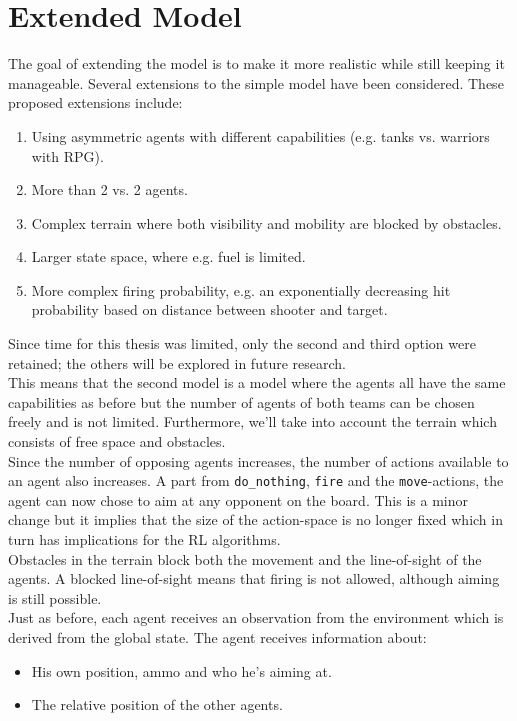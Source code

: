 \section{Extended Model}
\label{sec:extended_model}
The goal of extending the model is to make it more realistic while still keeping it manageable. Several extensions to the simple model have been considered. These proposed extensions include:
\begin{enumerate}
    \item Using asymmetric agents with different capabilities (e.g. tanks vs. warriors with RPG).
    \item More than 2 vs. 2 agents.
    \item Complex terrain where both visibility and mobility are blocked by obstacles.
    \item Larger state space, where e.g. fuel is limited.
    \item More complex firing probability, e.g. an exponentially decreasing hit probability based on distance between shooter and target.
\end{enumerate}
Since time for this thesis was limited, only the second and third option were retained; the others will be explored in future research.\\
This means that the second model is a model where the agents all have the same capabilities as before but the number of agents of both teams can be chosen freely and is not limited. Furthermore, we'll take into account the terrain which consists of free space and obstacles.\\
Since the number of opposing agents increases, the number of actions available to an agent also increases. A part from {\tt do\_nothing}, {\tt fire} and the {\tt move}-actions, the agent can now chose to aim at any opponent on the board. This is a minor change but it implies that the size of the action-space is no longer fixed which in turn has implications for the RL algorithms.\\
Obstacles in the terrain block both the movement and the line-of-sight of the agents. A blocked line-of-sight means that firing is not allowed, although aiming is still possible.\\
Just as before, each agent receives an observation from the environment which is derived from the global state. The agent receives information about:
\begin{itemize}
    \item His own position, ammo and who he's aiming at.
    \item The relative position of the other agents.
\end{itemize}
